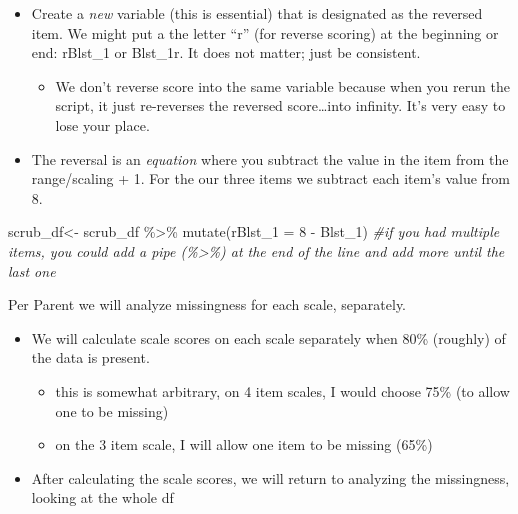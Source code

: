 \documentclass[
  english,
]{book}
\newenvironment{Shaded}{\begin{snugshade}}{\end{snugshade}}
\newcommand{\AttributeTok}[1]{\textcolor[rgb]{0.77,0.63,0.00}{#1}}
\newcommand{\CommentTok}[1]{\textcolor[rgb]{0.56,0.35,0.01}{\textit{#1}}}
\newcommand{\DecValTok}[1]{\textcolor[rgb]{0.00,0.00,0.81}{#1}}
\newcommand{\FunctionTok}[1]{\textcolor[rgb]{0.00,0.00,0.00}{#1}}
\newcommand{\NormalTok}[1]{#1}
\newcommand{\OtherTok}[1]{\textcolor[rgb]{0.56,0.35,0.01}{#1}}
\newcommand{\SpecialCharTok}[1]{\textcolor[rgb]{0.00,0.00,0.00}{#1}}
\providecommand{\tightlist}{%
  \setlength{\itemsep}{0pt}\setlength{\parskip}{0pt}}
\begin{document}
\begin{itemize}
\tightlist
\item
  Create a \emph{new} variable (this is essential) that is designated as the reversed item. We might put a the letter ``r'' (for reverse scoring) at the beginning or end: rBlst\_1 or Blst\_1r. It does not matter; just be consistent.

  \begin{itemize}
  \tightlist
  \item
    We don't reverse score into the same variable because when you rerun the script, it just re-reverses the reversed score\ldots into infinity. It's very easy to lose your place.
  \end{itemize}
\item
  The reversal is an \emph{equation} where you subtract the value in the item from the range/scaling + 1. For the our three items we subtract each item's value from 8.
\end{itemize}

\begin{Shaded}
\begin{Highlighting}[]
\NormalTok{scrub\_df}\OtherTok{\textless{}{-}}\NormalTok{ scrub\_df }\SpecialCharTok{\%\textgreater{}\%}
  \FunctionTok{mutate}\NormalTok{(}\AttributeTok{rBlst\_1 =} \DecValTok{8} \SpecialCharTok{{-}}\NormalTok{ Blst\_1) }\CommentTok{\#if you had multiple items, you could add a pipe (\%\textgreater{}\%) at the end of the line and add more until the last one}
\end{Highlighting}
\end{Shaded}

Per Parent \citeyearpar{parent_handling_2013} we will analyze missingness for each scale, separately.

\begin{itemize}
\tightlist
\item
  We will calculate scale scores on each scale separately when 80\% (roughly) of the data is present.

  \begin{itemize}
  \tightlist
  \item
    this is somewhat arbitrary, on 4 item scales, I would choose 75\% (to allow one to be missing)
  \item
    on the 3 item scale, I will allow one item to be missing (65\%)
  \end{itemize}
\item
  After calculating the scale scores, we will return to analyzing the missingness, looking at the whole df
\end{itemize}
\end{document}
